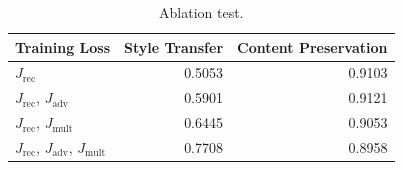 
\begin{table}[!t]
	\centering
	\begin{tabular}{| l | r | r |}
		\hline
		\textbf{Training Loss}                          & \textbf{Style Transfer} & \textbf{Content Preservation} \\
		\hline
		\hline
		$J_\text{rec}$                                  & 0.5053                  & 0.9103                        \\
		\hline
		$J_\text{rec}$, $J_\text{adv}$                  & 0.5901                  & 0.9121                        \\
		\hline
		$J_\text{rec}$, $J_\text{mult}$                 & 0.6445                  & 0.9053                        \\
		\hline
		$J_\text{rec}$, $J_\text{adv}$, $J_\text{mult}$ & 0.7708                  & 0.8958                        \\
		\hline
	\end{tabular}
	\caption{Ablation test.}
	\label{tab:ablation-results}
\end{table}



